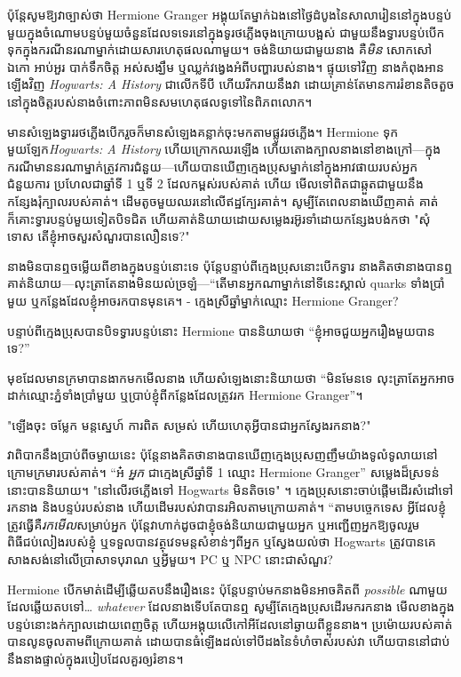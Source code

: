ប៉ុន្តែសូមឱ្យវាច្បាស់ថា Hermione Granger អង្គុយតែម្នាក់ឯងនៅថ្ងៃដំបូងនៃសាលារៀននៅក្នុងបន្ទប់មួយក្នុងចំណោមបន្ទប់មួយចំនួនដែលទទេរនៅក្នុងទូរថភ្លើងចុងក្រោយបង្អស់ ជាមួយនឹងទ្វារបន្ទប់បើកទុកក្នុងករណីនរណាម្នាក់ដោយសារហេតុផលណាមួយ។ ចង់និយាយជាមួយនាង គឺ\emph{មិន} សោកសៅ ឯកោ អាប់អួរ បាក់ទឹកចិត្ត អស់សង្ឃឹម ឬឈ្លក់វង្វេងអំពីបញ្ហារបស់នាង។ ផ្ទុយទៅវិញ នាងកំពុងអានឡើងវិញ \emph{Hogwarts: A History} ជាលើកទីបី ហើយរីករាយនឹងវា ដោយគ្រាន់តែមានការរំខានតិចតួចនៅក្នុងចិត្តរបស់នាងចំពោះភាពមិនសមហេតុផលទូទៅនៃពិភពលោក។

មាន​សំឡេង​ទ្វារ​រថភ្លើង​បើក​រួច​ក៏​មាន​សំឡេង​គន្លាក់​ចុះ​មក​តាម​ផ្លូវ​រថភ្លើង។ Hermione ទុកមួយឡែក\emph{Hogwarts: A History} ហើយក្រោកឈរឡើង ហើយតោងក្បាលនាងនៅខាងក្រៅ—ក្នុងករណីមាននរណាម្នាក់ត្រូវការជំនួយ—ហើយបានឃើញក្មេងប្រុសម្នាក់នៅក្នុងអាវផាយរបស់អ្នកជំនួយការ ប្រហែលជាឆ្នាំទី 1 ឬទី 2 ដែលកម្ពស់របស់គាត់ ហើយ មើលទៅពិតជាឆ្កួតជាមួយនឹងកន្សែងរុំក្បាលរបស់គាត់។ ដើមតូចមួយឈរនៅលើឥដ្ឋក្បែរគាត់។ សូម្បីតែពេលនាងឃើញគាត់ គាត់ក៏គោះទ្វារបន្ទប់មួយទៀតបិទជិត ហើយគាត់និយាយដោយសម្លេងរអ៊ូរទាំដោយកន្សែងបង់កថា "សុំទោស តើខ្ញុំអាចសួរសំណួរបានលឿនទេ?"

នាងមិនបានឮចម្លើយពីខាងក្នុងបន្ទប់នោះទេ ប៉ុន្តែបន្ទាប់ពីក្មេងប្រុសនោះបើកទ្វារ នាងគិតថានាងបានឮគាត់និយាយ—លុះត្រាតែនាងមិនយល់ច្រឡំ—“តើមានអ្នកណាម្នាក់នៅទីនេះស្គាល់ quarks ទាំងប្រាំមួយ ឬកន្លែងដែលខ្ញុំអាចរកបានមុនគេ។ - ក្មេងស្រីឆ្នាំម្នាក់ឈ្មោះ Hermione Granger?

បន្ទាប់​ពី​ក្មេង​ប្រុស​បាន​បិទ​ទ្វារ​បន្ទប់​នោះ Hermione បាន​និយាយ​ថា “ខ្ញុំ​អាច​ជួយ​អ្នក​រឿង​មួយ​បាន​ទេ?”

មុខ​ដែល​មាន​ក្រមា​បាន​ងាក​មក​មើល​នាង ហើយ​សំឡេង​នោះ​និយាយ​ថា “មិនមែន​ទេ លុះ​ត្រា​តែ​អ្នក​អាច​ដាក់​ឈ្មោះ​ភ្នំ​ទាំង​ប្រាំមួយ ឬ​ប្រាប់​ខ្ញុំ​ពី​កន្លែងដែល​ត្រូវ​រក Hermione Granger”។

"ឡើងចុះ ចម្លែក មន្តស្នេហ៍ ការពិត សម្រស់ ហើយហេតុអ្វីបានជាអ្នកស្វែងរកនាង?"

វាពិបាកនឹងប្រាប់ពីចម្ងាយនេះ ប៉ុន្តែនាងគិតថានាងបានឃើញក្មេងប្រុសញញឹមយ៉ាងទូលំទូលាយនៅក្រោមក្រមារបស់គាត់។ “អ៎ \emph{អ្នក} ជាក្មេងស្រីឆ្នាំទី 1 ឈ្មោះ Hermione Granger” សម្លេងដ៏ស្រទន់នោះបាននិយាយ។ "នៅលើរថភ្លើងទៅ Hogwarts មិនតិចទេ" ។ ក្មេង​ប្រុស​នោះ​ចាប់​ផ្តើម​ដើរ​សំដៅ​ទៅ​រក​នាង និង​បន្ទប់​របស់​នាង ហើយ​ដើម​របស់​វា​បាន​រអិល​តាម​ក្រោយ​គាត់។ “តាមបច្ចេកទេស អ្វីដែលខ្ញុំត្រូវធ្វើគឺ\emph{រកមើល}សម្រាប់អ្នក ប៉ុន្តែវាហាក់ដូចជាខ្ញុំចង់និយាយជាមួយអ្នក ឬអញ្ជើញអ្នកឱ្យចូលរួមពិធីជប់លៀងរបស់ខ្ញុំ ឬទទួលបានវត្ថុវេទមន្តសំខាន់ៗពីអ្នក ឬស្វែងយល់ថា Hogwarts ត្រូវ​បាន​គេ​សាង​សង់​នៅ​លើ​ប្រាសាទ​បុរាណ ឬ​អ្វី​មួយ។ PC ឬ NPC នោះជាសំណួរ?

Hermione បើកមាត់ដើម្បីឆ្លើយតបនឹងរឿងនេះ ប៉ុន្តែបន្ទាប់មកនាងមិនអាចគិតពី \emph{possible} ណាមួយដែលឆ្លើយតបទៅ…\emph{ whatever} ដែលនាងទើបតែបានឮ សូម្បីតែក្មេងប្រុសដើរមករកនាង មើលខាងក្នុង បន្ទប់នោះងក់ក្បាលដោយពេញចិត្ត ហើយអង្គុយលើកៅអីដែលនៅឆ្ងាយពីខ្លួននាង។ ប្រម៉ោយ​របស់​គាត់​បាន​លូន​ចូល​តាម​ពី​ក្រោយ​គាត់ ដោយ​បាន​ធំ​ឡើង​ដល់​ទៅ​បី​ដង​នៃ​ទំហំ​ចាស់​របស់​វា ហើយ​បាន​នៅ​ជាប់​នឹង​នាង​ផ្ទាល់​ក្នុង​របៀប​ដែល​គួរ​ឲ្យ​រំខាន។

